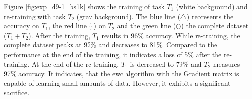 Figure \ref{fig:exp_d9-1_bs1k} shows the training of task $T_1$ (white background) and re-training with task $T_2$ (gray background).
The blue line ($\triangle$) represents the accuracy on $T_1$, the red line ($\square$) on $T_2$ and the green line ($\bigcirc$) the complete dataset ($T_1 + T_2$).
After the training, $T_1$ results in 96\% accuracy.
While re-training, the complete dataset peaks at 92\% and decreases to 81\%.
Compared to the performance at the end of the training, it indicates a loss of 5\% after the re-training.
At the end of the re-training, $T_1$ is decreased to 79\% and $T_2$ measures 97\% accuracy.
\newline
It indicates, that the \acrshort{ewc} algorithm with the Gradient matrix is capable of learning small amounts of data.
However, it exhibits a significant sacrifice.

